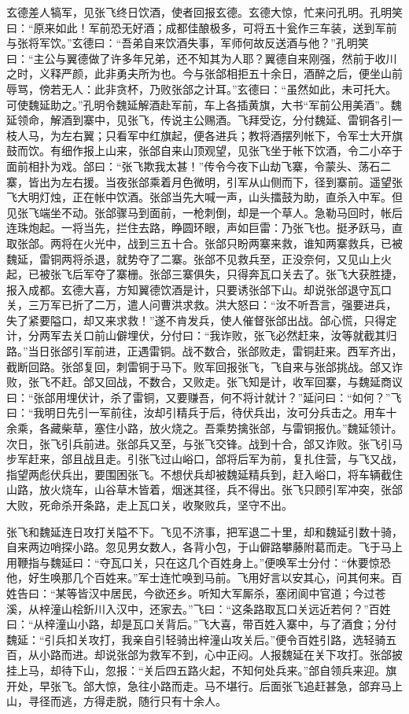 玄德差人犒军，见张飞终日饮酒，使者回报玄德。玄德大惊，忙来问孔明。孔明笑曰：“原来如此！军前恐无好酒；成都佳酿极多，可将五十瓮作三车装，送到军前与张将军饮。”玄德曰：“吾弟自来饮酒失事，军师何故反送酒与他？”孔明笑曰：“主公与翼德做了许多年兄弟，还不知其为人耶？翼德自来刚强，然前于收川之时，义释严颜，此非勇夫所为也。今与张郃相拒五十余日，酒醉之后，便坐山前辱骂，傍若无人：此非贪杯，乃败张郃之计耳。”玄德曰：“虽然如此，未可托大。可使魏延助之。”孔明令魏延解酒赴军前，车上各插黄旗，大书“军前公用美酒”。魏延领命，解酒到寨中，见张飞，传说主公赐酒。飞拜受讫，分付魏延、雷铜各引一枝人马，为左右翼；只看军中红旗起，便各进兵；教将酒摆列帐下，令军士大开旗鼓而饮。有细作报上山来，张郃自来山顶观望，见张飞坐于帐下饮酒，令二小卒于面前相扑为戏。郃曰：“张飞欺我太甚！”传令今夜下山劫飞寨，令蒙头、荡石二寨，皆出为左右援。当夜张郃乘着月色微明，引军从山侧而下，径到寨前。遥望张飞大明灯烛，正在帐中饮酒。张郃当先大喊一声，山头擂鼓为助，直杀入中军。但见张飞端坐不动。张郃骤马到面前，一枪刺倒，却是一个草人。急勒马回时，帐后连珠炮起。一将当先，拦住去路，睁圆环眼，声如巨雷：乃张飞也。挺矛跃马，直取张郃。两将在火光中，战到三五十合。张郃只盼两寨来救，谁知两寨救兵，已被魏延，雷铜两将杀退，就势夺了二寨。张郃不见救兵至，正没奈何，又见山上火起，已被张飞后军夺了寨栅。张郃三寨俱失，只得奔瓦口关去了。张飞大获胜捷，报入成都。玄德大喜，方知翼德饮酒是计，只要诱张郃下山。却说张郃退守瓦口关，三万军已折了二万，遣人问曹洪求救。洪大怒曰：“汝不听吾言，强要进兵，失了紧要隘口，却又来求救！”遂不肯发兵，使人催督张郃出战。郃心慌，只得定计，分两军去关口前山僻埋伏，分付曰：“我诈败，张飞必然赶来，汝等就截其归路。”当日张郃引军前进，正遇雷铜。战不数合，张郃败走，雷铜赶来。西军齐出，截断回路。张郃复回，刺雷铜于马下。败军回报张飞，飞自来与张郃挑战。郃又诈败，张飞不赶。郃又回战，不数合，又败走。张飞知是计，收军回寨，与魏延商议曰：“张郃用埋伏计，杀了雷铜，又要赚吾，何不将计就计？”延问曰：“如何？”飞曰：“我明日先引一军前往，汝却引精兵于后，待伏兵出，汝可分兵击之。用车十余乘，各藏柴草，塞住小路，放火烧之。吾乘势擒张郃，与雷铜报仇。”魏延领计。次日，张飞引兵前进。张郃兵又至，与张飞交锋。战到十合，郃又诈败。张飞引马步军赶来，郃且战且走。引张飞过山峪口，郃将后军为前，复扎住营，与飞又战，指望两彪伏兵出，要围困张飞。不想伏兵却被魏延精兵到，赶入峪口，将车辆截住山路，放火烧车，山谷草木皆着，烟迷其径，兵不得出。张飞只顾引军冲突，张郃大败，死命杀开条路，走上瓦口关，收聚败兵，坚守不出。

张飞和魏延连日攻打关隘不下。飞见不济事，把军退二十里，却和魏延引数十骑，自来两边哨探小路。忽见男女数人，各背小包，于山僻路攀藤附葛而走。飞于马上用鞭指与魏延曰：“夺瓦口关，只在这几个百姓身上。”便唤军士分付：“休要惊恐他，好生唤那几个百姓来。”军士连忙唤到马前。飞用好言以安其心，问其何来。百姓告曰：“某等皆汉中居民，今欲还乡。听知大军厮杀，塞闭阆中官道；今过苍溪，从梓潼山桧釿川入汉中，还家去。”飞曰：“这条路取瓦口关远近若何？”百姓曰：“从梓潼山小路，却是瓦口关背后。”飞大喜，带百姓入寨中，与了酒食；分付魏延：“引兵扣关攻打，我亲自引轻骑出梓潼山攻关后。”便令百姓引路，选轻骑五百，从小路而进。却说张郃为救军不到，心中正闷。人报魏延在关下攻打。张郃披挂上马，却待下山，忽报：“关后四五路火起，不知何处兵来。”郃自领兵来迎。旗开处，早张飞。郃大惊，急往小路而走。马不堪行。后面张飞追赶甚急，郃弃马上山，寻径而逃，方得走脱，随行只有十余人。

